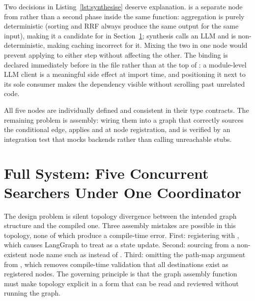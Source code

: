 Two decisions in Listing~\ref{lst:synthesise} deserve explanation.
 is a separate node from 
rather than a second phase inside the same function: aggregation is purely
deterministic (sorting and RRF always produce the same output for the same
input), making it a candidate for  in
Section~\ref{sec:full-parallel}; synthesis calls an LLM and is
non-deterministic, making caching incorrect for it. Mixing the two in one
node would prevent applying  to either step without
affecting the other. The  binding is declared
immediately before  in the file rather than at the
top of : a module-level LLM client is a meaningful
side effect at import time, and positioning it next to its sole consumer
makes the dependency visible without scrolling past unrelated code.

All five nodes are individually defined and consistent in their type
contracts. The remaining problem is assembly: wiring them into a graph
that correctly sources the conditional edge, applies 
and  at node registration, and is verified by an
integration test that mocks backends rather than calling unreachable stubs.


\section{Full System: Five Concurrent Searchers Under One Coordinator}
\label{sec:full-parallel}

The design problem is silent topology divergence between the intended
graph structure and the compiled one. Three assembly mistakes are possible
in this topology, none of which produce a compile-time error. First:
registering  with , which causes
LangGraph to treat  as a state update. Second: sourcing
 from a non-existent node name such as
 instead of . Third: omitting the
 path-map argument from
, which removes compile-time validation that
all  destinations exist as registered nodes. The governing
principle is that the graph assembly function must make topology explicit
in a form that can be read and reviewed without running the graph.

